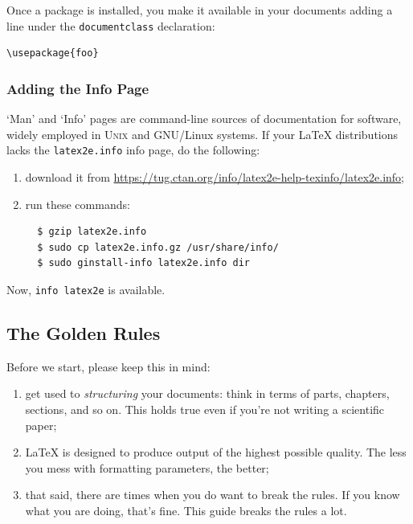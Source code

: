 \documentclass[a4paper,11pt]{article}
\newcommand{\unix}{\textsc{Unix}}
\newcommand{\cmdline}[1]
{\texttt{#1}}
\newcommand{\File}[1]
{\texttt{#1}}
\newcommand{\ltx}[1]
{\texttt{#1}}
\begin{document}
Once a package is installed, you make it available in your documents
adding a line under the \ltx{documentclass} declaration:

\begin{verbatim}
\usepackage{foo}
\end{verbatim}


\subsubsection{Adding the Info Page}
\label{sec:infopage}

`Man' and `Info' pages are command-line sources of documentation for
software, widely employed in \unix{} and GNU/Linux systems. If your
\LaTeX{} distributions lacks the \File{latex2e.info} info page, do the
following:

\begin{enumerate}

  \item download it from
  \url{https://tug.ctan.org/info/latex2e-help-texinfo/latex2e.info};

  \item run these commands:

  \begin{verbatim}
  $ gzip latex2e.info
  $ sudo cp latex2e.info.gz /usr/share/info/
  $ sudo ginstall-info latex2e.info dir
  \end{verbatim}

\end{enumerate}

Now, \cmdline{info latex2e} is available.



\subsection{The Golden Rules}

Before we start, please keep this in mind:

\begin{enumerate}

  \item get used to \emph{structuring} your documents: think in terms of
  parts, chapters, sections, and so on. This holds true even if you're
  not writing a scientific paper;

  \item \LaTeX{} is designed to produce output of the highest possible quality. The less you mess with formatting parameters, the better;

  \item that said, there are times when you do want to break the rules. If you know what you are doing, that's fine. This guide breaks the rules a lot.

\end{enumerate}
\end{document}
